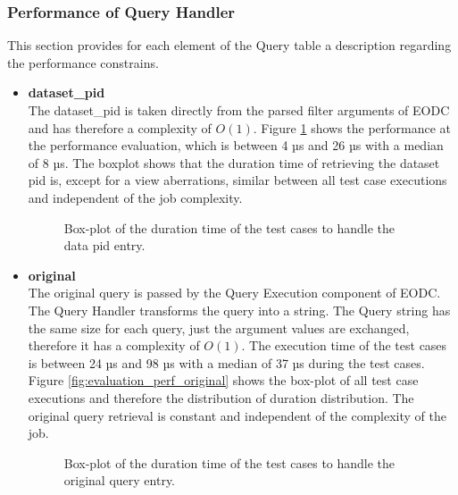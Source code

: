 \documentclass[draft,final]{vutinfth} %
\begin{document}
\subsubsection{Performance of Query Handler}\label{Evaluation:impact_perf_query}
This section provides for each element of the Query table a description regarding the performance constrains.
\begin{itemize}
	\item \textbf{dataset\_pid} \\
	The dataset\_pid is taken directly from the parsed filter arguments of EODC and has therefore a complexity of $O(1)$. Figure \ref{fig:evaluation_perf_datapid} shows the performance at the performance evaluation, which is between 4 µs and 26 µs with a median of 8 µs. The boxplot shows that the duration time of retrieving the dataset pid is, except for a view aberrations, similar between all test case executions and independent of the job complexity.    
	\begin{figure}[!h]
		\centering
		\caption{Box-plot of the duration time of the test cases to handle the data pid entry. }
		\label{fig:evaluation_perf_datapid}
	\end{figure}
	\item \textbf{original} \\
	The original query is passed by the Query Execution component of EODC. The Query Handler transforms the query into a string. The Query string has the same size for each query, just the argument values are exchanged, therefore it has a complexity of $O(1)$. The execution time of the test cases is between 24 µs and 98 µs with a median of 37 µs during the test cases. Figure \ref{fig:evaluation_perf_original} shows the box-plot of all test case executions and therefore the distribution of duration distribution. The original query retrieval is constant and independent of the complexity of the job. 
	\begin{figure}[!h]
		\centering
		\caption{Box-plot of the duration time of the test cases to handle the original query entry.}

\end{figure}
\end{itemize}
\end{document}
